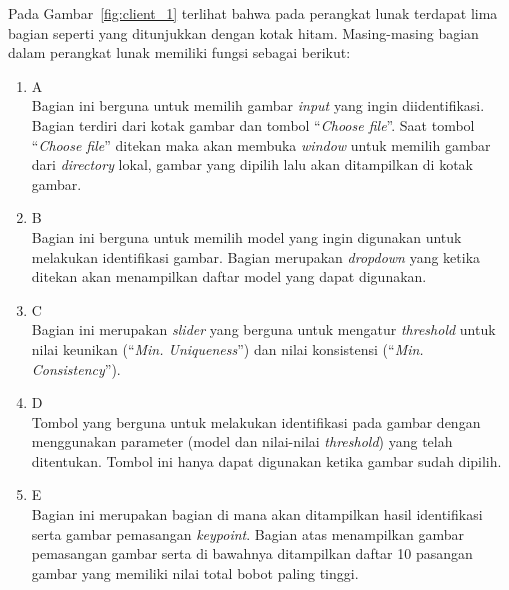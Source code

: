 Pada Gambar~\ref{fig:client_1} terlihat bahwa pada perangkat lunak terdapat lima bagian seperti yang ditunjukkan dengan kotak hitam. Masing-masing bagian dalam perangkat lunak memiliki fungsi sebagai berikut:
\begin{enumerate}
	\item A \\
	Bagian ini berguna untuk memilih gambar \textit{input} yang ingin diidentifikasi. Bagian terdiri dari kotak gambar dan tombol ``\textit{Choose file}''. Saat tombol ``\textit{Choose file}'' ditekan maka akan membuka \textit{window} untuk memilih gambar dari \textit{directory} lokal, gambar yang dipilih lalu akan ditampilkan di kotak gambar. 
	\item B \\
	Bagian ini berguna untuk memilih model yang ingin digunakan untuk melakukan identifikasi gambar. Bagian merupakan \textit{dropdown} yang ketika ditekan akan menampilkan daftar model yang dapat digunakan.
	\item C \\
	Bagian ini merupakan \textit{slider} yang berguna untuk mengatur \textit{threshold} untuk nilai keunikan (``\textit{Min. Uniqueness}'') dan nilai konsistensi (``\textit{Min. Consistency}'').
	\item D \\
	Tombol yang berguna untuk melakukan identifikasi pada gambar dengan menggunakan parameter (model dan nilai-nilai \textit{threshold}) yang telah ditentukan. Tombol ini hanya dapat digunakan ketika gambar sudah dipilih.
	\item E \\
	Bagian ini merupakan bagian di mana akan ditampilkan hasil identifikasi serta gambar pemasangan \textit{keypoint}. Bagian atas menampilkan gambar pemasangan gambar serta di bawahnya ditampilkan daftar 10 pasangan gambar yang memiliki nilai total bobot paling tinggi.
\end{enumerate}

